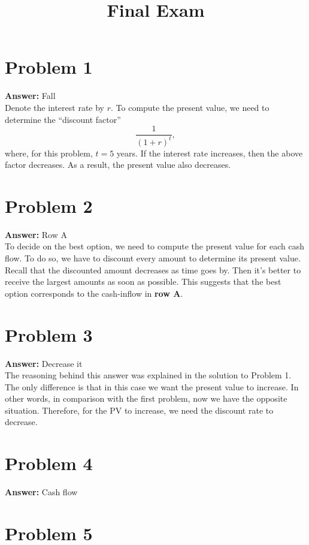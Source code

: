 \documentclass[11pt]{article}
\date{}
\title{Final Exam}
\begin{document}
\thispagestyle{empty}
\pagestyle{empty}
\section*{Problem 1}
\label{sec:orgf7c355e}

\textbf{Answer:} Fall\\

Denote the interest rate by \(r\). To compute the present value, we need to
determine the ``discount factor''
\begin{equation*}
\frac{1}{(1+r)^t},
\end{equation*}
where, for this problem, \(t=5\) years. If the interest rate increases, then
the above factor decreases. As a result, the present value also decreases.
\section*{Problem 2}
\label{sec:orge777e81}

\textbf{Answer:} Row A\\

To decide on the best option, we need to compute the present value for each cash
flow. To do so, we have to discount every amount to determine its present value.
Recall that the discounted amount decreases as time goes by. Then it's better to
receive the largest amounts as soon as possible. This suggests that the best
option corresponds to the cash-inflow in \textbf{row A}.
\section*{Problem 3}
\label{sec:org06273c0}

\textbf{Answer:} Decrease it\\

The reasoning behind this answer was explained in the solution to Problem 1. The
only difference is that in this case we want the present value to increase. In
other words, in comparison with the first problem, now we have the opposite
situation. Therefore, for the PV to increase, we need the discount rate to
decrease.
\section*{Problem 4}
\label{sec:orga0517f9}

\textbf{Answer:} Cash flow
\section*{Problem 5}
\label{sec:org1676374}
\end{document}
